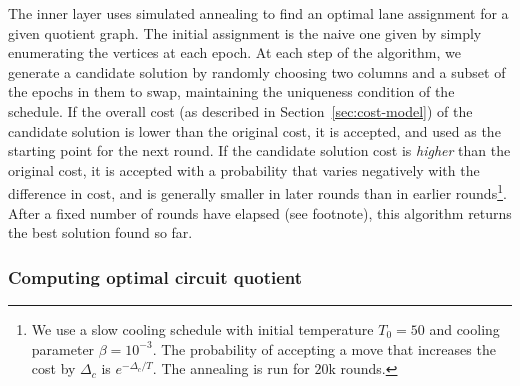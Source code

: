 The inner layer uses simulated annealing to find an optimal lane assignment for a given quotient graph.
The initial assignment is the naive one given by simply enumerating the vertices at each epoch.
At each step of the algorithm, we generate a candidate solution by randomly choosing two columns and a subset of the epochs in them to swap, maintaining the uniqueness condition of the schedule.
If the overall cost (as described in Section~\ref{sec:cost-model})
of the candidate solution is lower than the original cost, it is accepted, and used as the starting point for the next round.
If the candidate solution cost is {\em higher} than the original cost, it is accepted with a probability that varies negatively with the difference in cost, and is generally smaller in later rounds than in earlier rounds\footnote{We use a slow cooling schedule with initial temperature $T_0=50$ and cooling parameter $\beta=10^{-3}$. The probability of accepting a move that increases the cost by $\Delta_c$ is $e^{-\Delta_c/T}$. The annealing is run for $20$k rounds.}.
After a fixed number of rounds have elapsed (see footnote), this algorithm returns the best solution found so far.

\subsubsection*{Computing optimal circuit quotient}



